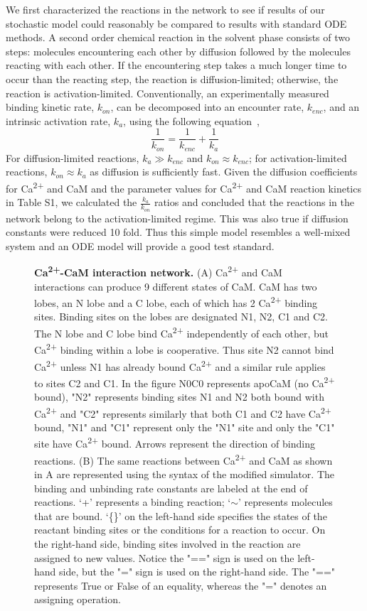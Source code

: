 \documentclass[10pt,letterpaper]{article}
\begin{document}
We first characterized the reactions in the network to see if results of our stochastic model could reasonably be compared to results with standard ODE methods. A second order chemical reaction in the solvent phase consists of two steps: molecules encountering each other by diffusion followed by the molecules reacting with each other. If the encountering step takes a much longer time to occur than the reacting step, the reaction is diffusion-limited; otherwise, the reaction is activation-limited. Conventionally, an experimentally measured binding kinetic rate, $k_{on}$, can be decomposed into an encounter rate, $k_{enc}$, and an intrinsic activation rate, $k_{a}$, using the following equation~\cite{Rice:198505},
\begin{equation}\frac{1}{k_{on}}=\frac{1}{k_{enc}}+\frac{1}{k_a}\end{equation}
For diffusion-limited reactions, $k_a \gg k_{enc}$ and $k_{on} \approx k_{enc}$; for activation-limited reactions, $k_{on} \approx k_a$ as diffusion is sufficiently fast. Given the diffusion coefficients for Ca\textsuperscript{2+} and CaM and the parameter values for Ca\textsuperscript{2+} and CaM reaction kinetics in Table S1, we calculated the $\frac{k_a}{k_{on}}$ ratios and concluded that the reactions in the network belong to the activation-limited regime. This was also true if diffusion constants were reduced 10 fold. Thus this simple model resembles a well-mixed system and an ODE model will provide a good test standard. 
\begin{figure}[!h]
	\caption{{\bf Ca\textsuperscript{2+}-CaM interaction network.}
	(A) Ca\textsuperscript{2+} and CaM interactions can produce 9 different states of CaM. CaM has two lobes, an N lobe and a C lobe, each of which has 2 Ca\textsuperscript{2+} binding sites. Binding sites on the lobes are designated N1, N2, C1 and C2. The N lobe and C lobe bind Ca\textsuperscript{2+} independently of each other, but Ca\textsuperscript{2+} binding within a lobe is cooperative. Thus site N2 cannot bind Ca\textsuperscript{2+} unless N1 has already bound Ca\textsuperscript{2+} and a similar rule applies to sites C2 and C1. In the figure N0C0 represents apoCaM (no Ca\textsuperscript{2+} bound), "N2" represents binding sites N1 and N2 both bound with Ca\textsuperscript{2+} and "C2" represents similarly that both C1 and C2 have Ca\textsuperscript{2+} bound, "N1" and "C1" represent only the "N1" site and only the "C1" site have Ca\textsuperscript{2+} bound. Arrows represent the direction of binding reactions.
	(B) The same reactions between Ca\textsuperscript{2+} and CaM as shown in A are represented using the syntax of the modified simulator. The binding and unbinding rate constants are labeled at the end of reactions. ‘+’ represents a binding reaction; ‘$\sim$’ represents molecules that are bound. ‘\{\}’ on the left-hand side specifies the states of the reactant binding sites or the conditions for a reaction to occur. On the right-hand side, binding sites involved in the reaction are assigned to new values. Notice the "==" sign is used on the left-hand side, but the "=" sign is used on the right-hand side. The "==" represents True or False of an equality, whereas the "=" denotes an assigning operation. 
	}
\label{fig1}
\end{figure}
\end{document}
